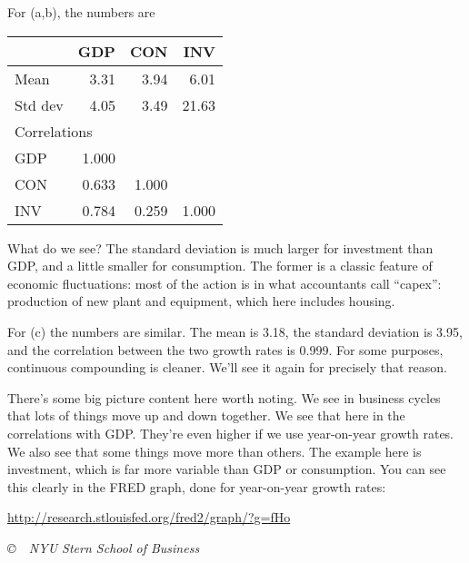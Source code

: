 \documentclass[12pt]{exam}
\begin{document}
\begin{questions}
\begin{solution}
For (a,b), the numbers are
%
\begin{center}
\begin{tabular}{lrrr}
\toprule
            &   GDP   &  CON  & INV    \\
\midrule
Mean        &  3.31 &  3.94 & 6.01  \\
Std dev     &  4.05 &  3.49 & 21.63 \\
\midrule
\multicolumn{2}{l}{Correlations} \\
GDP         &  1.000 \\
CON         &  0.633 & 1.000 \\
INV         &  0.784 & 0.259 & 1.000 \\
\bottomrule
\end{tabular}
\end{center}
%
What do we see?  The standard deviation is much larger for investment
than GDP,
and a little smaller for consumption.
The former is a classic feature of economic fluctuations:
most of the action is in what accountants call ``capex'':
production of new plant and equipment, which here includes housing.

For (c) the numbers are similar.
The mean is 3.18, the standard deviation is 3.95,
and the correlation between the two growth rates is 0.999.
For some purposes, continuous compounding is cleaner.
We'll see it again for precisely that reason.

There's some big picture content here worth noting.
We see in business cycles that lots of things move up and down together.
We see that here in the correlations with GDP.
They're even higher if we use year-on-year growth rates.
We also see that some things move more than others.
The example here is investment,
which is far more variable than GDP or consumption.
You can see this clearly in the FRED graph, done
for year-on-year growth rates:

\vspace*{\parskip}
\centerline{\url{http://research.stlouisfed.org/fred2/graph/?g=fHo}}


\end{solution}

\end{questions}


\vfill \centerline{\it \copyright \ \number\year \
NYU Stern School of Business}
\end{document}

